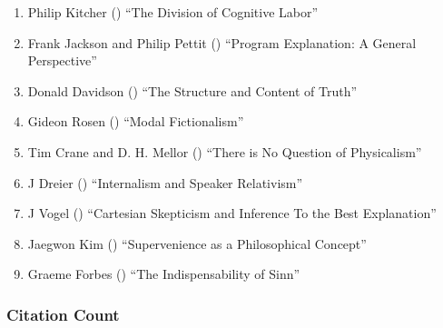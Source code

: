 \documentclass[
  10pt,
  letterpaper,
  DIV=11,
  numbers=noendperiod,
  twoside]{scrartcl}
\providecommand{\tightlist}{%
  \setlength{\itemsep}{0pt}\setlength{\parskip}{0pt}}\usepackage{longtable,booktabs,array}
\begin{document}
\begin{enumerate}
\def\labelenumi{\arabic{enumi}.}
\tightlist
\item
  Philip Kitcher () ``The
  Division of Cognitive Labor''
\item
  Frank Jackson and Philip Pettit
  () ``Program Explanation: A
  General Perspective''
\item
  Donald Davidson () ``The
  Structure and Content of Truth''
\item
  Gideon Rosen () ``Modal
  Fictionalism''
\item
  Tim Crane and D. H. Mellor ()
  ``There is No Question of Physicalism''
\item
  J Dreier () ``Internalism and
  Speaker Relativism''
\item
  J Vogel () ``Cartesian
  Skepticism and Inference To the Best Explanation''
\item
  Jaegwon Kim () ``Supervenience
  as a Philosophical Concept''
\item
  Graeme Forbes () ``The
  Indispensability of Sinn''
\end{enumerate}

\subsubsection*{Citation Count}\label{sec-count-1990}
\end{document}
